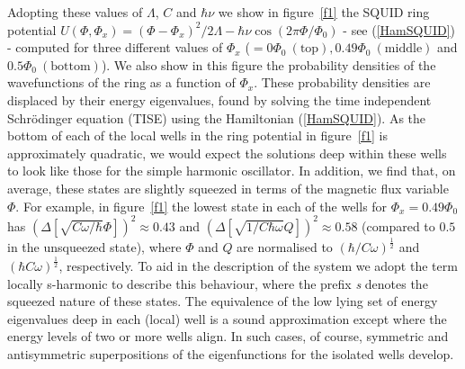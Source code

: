 \documentclass[twocolumn,a4paper,superscriptaddress,showpacs,floatfix,pra]{revtex4}
\begin{document}
Adopting these values  of $\Lambda $, $C$ and $\hbar \nu  $ we show in
figure~\ref{f1}   the  SQUID  ring   potential  $U\left(   \Phi  ,\Phi
_{x}\right)  =\left( \Phi -\Phi  _{x}\right) ^{2}/2\Lambda  -\hbar \nu
\cos \left(  2\pi \Phi  /\Phi _{0}\right) $  - see  (\ref{HamSQUID}) -
computed  for   three  different   values  of  $\Phi   _{x}$  ($=0\Phi
_{0}\mathrm{\ (top)},0.49\Phi  _{0}\mathrm{\ (middle)} $  and $0.5\Phi
_{0}\mathrm{\ (bottom)}$). We also show in this figure the probability
densities  of the wavefunctions  of the  ring as  a function  of $\Phi
_{x}$.  These  probability densities  are  displaced  by their  energy
eigenvalues,  found by  solving the  time  independent Schr\"{o}dinger
equation (TISE) using the  Hamiltonian (\ref{HamSQUID}). As the bottom
of each of the local wells in the ring potential in figure~\ref{f1} is
approximately  quadratic, we  would expect  the solutions  deep within
these wells to look like  those for the simple harmonic oscillator. In
addition, we find that, on average, these states are slightly squeezed
in  terms of  the  magnetic flux  variable  $\Phi $.  For example,  in
figure~\ref{f1}  the lowest  state  in  each of  the  wells for  $\Phi
_{x}=0.49\Phi  _{0}$ has  $\left( \Delta  \left[  \sqrt{C\omega /\hbar
}\Phi  \right] \right)  ^{2}\approx  0.43$ and  $\left( \Delta  \left[
\sqrt{1/C\hbar \omega  }Q\right] \right) ^{2}\approx  0.58 $ (compared
to  $0.5$  in  the  unsqueezed  state),  where $\Phi  $  and  $Q$  are
normalised  to  $\left(  \hbar  /C\omega \right)  ^{\frac{1}{2}}$  and
$\left( \hbar C\omega \right) ^{\frac{1}{2}}$, respectively. To aid in
the description of the system  we adopt the term locally s-harmonic to
describe  this  behaviour,  where  the  prefix  \emph{s}  denotes  the
squeezed nature of these states.  The equivalence of the low lying set
of  energy  eigenvalues   deep  in  each  (local)  well   is  a  sound
approximation  except where  the energy  levels of  two or  more wells
align.  In   such  cases,  of  course,   symmetric  and  antisymmetric
superpositions of the eigenfunctions for the isolated wells develop.
\end{document}
